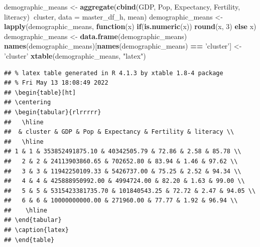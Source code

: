 \documentclass[]{article}
\newenvironment{Shaded}{\begin{snugshade}}{\end{snugshade}}
\newcommand{\ControlFlowTok}[1]{\textcolor[rgb]{0.13,0.29,0.53}{\textbf{#1}}}
\newcommand{\DataTypeTok}[1]{\textcolor[rgb]{0.13,0.29,0.53}{#1}}
\newcommand{\DecValTok}[1]{\textcolor[rgb]{0.00,0.00,0.81}{#1}}
\newcommand{\KeywordTok}[1]{\textcolor[rgb]{0.13,0.29,0.53}{\textbf{#1}}}
\newcommand{\NormalTok}[1]{#1}
\newcommand{\OperatorTok}[1]{\textcolor[rgb]{0.81,0.36,0.00}{\textbf{#1}}}
\newcommand{\StringTok}[1]{\textcolor[rgb]{0.31,0.60,0.02}{#1}}
\begin{document}
\begin{Shaded}
\begin{Highlighting}[]
\NormalTok{demographic_means <-}\StringTok{ }\KeywordTok{aggregate}\NormalTok{(}\KeywordTok{cbind}\NormalTok{(GDP, Pop, Expectancy, Fertility, literacy)}\OperatorTok{~}\NormalTok{cluster, }
                               \DataTypeTok{data =}\NormalTok{ master_df_h, mean)}
\NormalTok{demographic_means <-}\StringTok{ }\KeywordTok{lapply}\NormalTok{(demographic_means, }\ControlFlowTok{function}\NormalTok{(x) }\ControlFlowTok{if}\NormalTok{(}\KeywordTok{is.numeric}\NormalTok{(x)) }\KeywordTok{round}\NormalTok{(x, }\DecValTok{3}\NormalTok{) }\ControlFlowTok{else}\NormalTok{ x)}
\NormalTok{demographic_means <-}\StringTok{ }\KeywordTok{data.frame}\NormalTok{(demographic_means)}
\KeywordTok{names}\NormalTok{(demographic_means)[}\KeywordTok{names}\NormalTok{(demographic_means) }\OperatorTok{==}\StringTok{ 'cluster'}\NormalTok{] <-}\StringTok{ 'cluster'}
\KeywordTok{xtable}\NormalTok{(demographic_means, }\StringTok{"latex"}\NormalTok{)}
\end{Highlighting}
\end{Shaded}

\begin{verbatim}
## % latex table generated in R 4.1.3 by xtable 1.8-4 package
## % Fri May 13 18:08:49 2022
## \begin{table}[ht]
## \centering
## \begin{tabular}{rlrrrrr}
##   \hline
##  & cluster & GDP & Pop & Expectancy & Fertility & literacy \\ 
##   \hline
## 1 & 1 & 353852491875.10 & 40342505.79 & 72.86 & 2.58 & 85.78 \\ 
##   2 & 2 & 24113903860.65 & 702652.80 & 83.94 & 1.46 & 97.62 \\ 
##   3 & 3 & 11942250109.33 & 5426737.00 & 75.25 & 2.52 & 94.34 \\ 
##   4 & 4 & 425888950992.00 & 4994724.00 & 82.20 & 1.63 & 99.00 \\ 
##   5 & 5 & 5315423381735.70 & 101840543.25 & 72.72 & 2.47 & 94.05 \\ 
##   6 & 6 & 10000000000.00 & 271960.00 & 77.77 & 1.92 & 96.94 \\ 
##    \hline
## \end{tabular}
## \caption{latex} 
## \end{table}
\end{verbatim}
\end{document}

